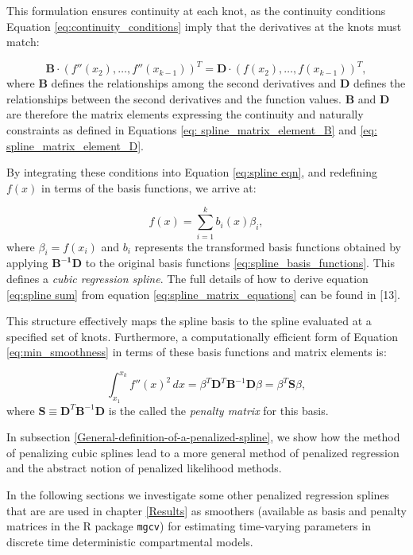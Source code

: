 \documentclass[
11pt, %
oneside, %
english, %
singlespacing, %
]{macthesis} %
\begin{document}
This formulation ensures continuity at each knot, as the continuity conditions Equation \ref{eq:continuity_conditions} imply that the derivatives at the knots must match:

\begin{equation}
\mathbf{B} \cdot (f''(x_2),\dots, f''(x_{k-1}))^{T} = \mathbf{D} \cdot (f(x_2),\dots, f(x_{k-1}))^{T},
\label{eq:spline_matrix_equations}
\end{equation}
where \(\mathbf{B}\) defines the relationships among the second derivatives and \(\mathbf{D}\) defines the relationships between the second derivatives and the function values. \(\mathbf{B}\) and \(\mathbf{D}\) are therefore the matrix elements expressing the continuity and naturally constraints as defined in Equations \ref{eq: spline_matrix_element_B} and \ref{eq: spline_matrix_element_D}.

By integrating these conditions into Equation \ref{eq:spline eqn}, and redefining \(f(x)\) in terms of the basis functions, we arrive at:

\begin{equation}
f(x) = \sum_{i=1}^{k}b_i(x)\beta_i,
\label{eq:spline sum}
\end{equation}
where \(\beta_i = f(x_i)\) and \(b_i\) represents the transformed basis functions obtained by applying \(\mathbf{B^{-1}D}\) to the original basis functions \ref{eq:spline_basis_functions}. This defines a \emph{cubic regression spline}. The full details of how to derive equation \ref{eq:spline sum} from equation \ref{eq:spline_matrix_equations} can be found in {[}13{]}.

This structure effectively maps the spline basis to the spline evaluated at a specified set of knots. Furthermore, a computationally efficient form of Equation \ref{eq:min_smoothness} in terms of these basis functions and matrix elements is:

\[
\int_{x_1}^{x_k} f''(x)^2 \, dx = \beta^T \mathbf{D}^T \mathbf{B}^{-1} \mathbf{D} \beta =  \beta^T \mathbf{S} \beta,
\]
where \(\mathbf{S} \equiv \mathbf{D}^T \mathbf{B}^{-1} \mathbf{D}\) is the called the \emph{penalty matrix} for this basis.

In subsection \ref{General-definition-of-a-penalized-spline}, we show how the method of penalizing cubic splines lead to a more general method of penalized regression and the abstract notion of penalized likelihood methods.

In the following sections we investigate some other penalized regression splines that are are used in chapter \ref{Results} as smoothers (available as basis and penalty matrices in the R package \texttt{mgcv}) for estimating time-varying parameters in discrete time deterministic compartmental models.
\end{document}
